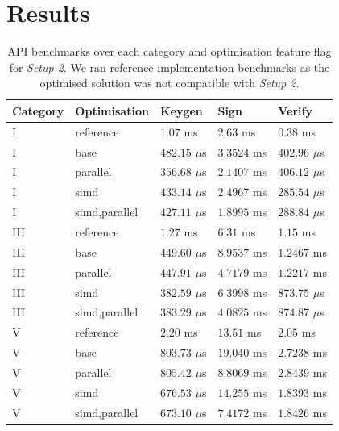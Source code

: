 \documentclass[11pt]{report}
\theoremstyle{definition}
\theoremstyle{plain}
\begin{document}
\section{Results}\label{sub:results}

\begin{table}[H]
  \centering
  \begin{tabular}{l|l|lll}
    \hline
    Category                     & Optimisation  & Keygen          & Sign        & Verify          \\
    \hline
    \hline
    I \cite{aguilar2023return}   & reference     & $1.07$ ms       & $2.63$ ms   & $0.38$ ms       \\
    \arrayrulecolor{lightgray}\hline\arrayrulecolor{black}
    I                            & base          & $482.15$ $\mu$s & $3.3524$ ms & $402.96$ $\mu$s \\
    I                            & parallel      & $356.68$ $\mu$s & $2.1407$ ms & $406.12$ $\mu$s \\
    I                            & simd          & $433.14$ $\mu$s & $2.4967$ ms & $285.54$ $\mu$s \\
    I                            & simd,parallel & $427.11$ $\mu$s & $1.8995$ ms & $288.84$ $\mu$s \\
    \hline
    III \cite{aguilar2023return} & reference     & $1.27$ ms       & $6.31$ ms   & $1.15$ ms       \\
    \arrayrulecolor{lightgray}\hline\arrayrulecolor{black}
    III                          & base          & $449.60$ $\mu$s & $8.9537$ ms & $1.2467$ ms     \\
    III                          & parallel      & $447.91$ $\mu$s & $4.7179$ ms & $1.2217$ ms     \\
    III                          & simd          & $382.59$ $\mu$s & $6.3998$ ms & $873.75$ $\mu$s \\
    III                          & simd,parallel & $383.29$ $\mu$s & $4.0825$ ms & $874.87$ $\mu$s \\
    \hline
    V \cite{aguilar2023return}   & reference     & $2.20$ ms       & $13.51$ ms  & $2.05$ ms       \\
    \arrayrulecolor{lightgray}\hline\arrayrulecolor{black}
    V                            & base          & $803.73$ $\mu$s & $19.040$ ms & $2.7238$ ms     \\
    V                            & parallel      & $805.42$ $\mu$s & $8.8069$ ms & $2.8439$ ms     \\
    V                            & simd          & $676.53$ $\mu$s & $14.255$ ms & $1.8393$ ms     \\
    V                            & simd,parallel & $673.10$ $\mu$s & $7.4172$ ms & $1.8426$ ms     \\
    \hline
  \end{tabular}
  \caption{API benchmarks over each category and optimisation feature flag for \textit{Setup 2}. We ran reference implementation benchmarks as the optimised solution was not compatible with \textit{Setup 2}.}
  \label{tab:api_mac_results}
\end{table}
\end{document}
